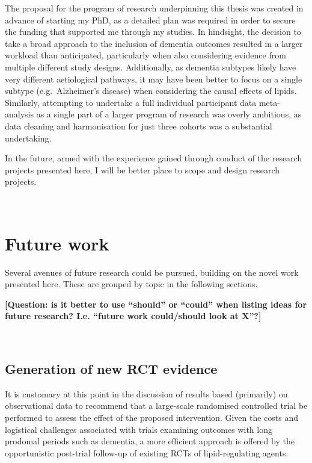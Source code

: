 \documentclass[a4paper, twoside]{templates/ociamthesis}
\begin{document}
The proposal for the program of research underpinning this thesis was created in advance of starting my PhD, as a detailed plan was required in order to secure the funding that supported me through my studies. In hindsight, the decision to take a broad approach to the inclusion of dementia outcomes resulted in a larger workload than anticipated, particularly when also considering evidence from multiple different study designs. Additionally, as dementia subtypes likely have very different aetiological pathways, it may have been better to focus on a single subtype (e.g.~Alzheimer's disease) when considering the causal effects of lipids. Similarly, attempting to undertake a full individual participant data meta-analysis as a single part of a larger program of research was overly ambitious, as data cleaning and harmonisation for just three cohorts was a substantial undertaking.

In the future, armed with the experience gained through conduct of the research projects presented here, I will be better place to scope and design research projects.

~

\hypertarget{future-work-1}{%
\section{Future work}\label{future-work-1}}

Several avenues of future research could be pursued, building on the novel work presented here. These are grouped by topic in the following sections.

\textbf{{[}Question: is it better to use ``should'' or ``could'' when listing ideas for future research? I.e. ``future work could/should look at X''?{]}}

~

\hypertarget{generation-of-new-rct-evidence}{%
\subsection{Generation of new RCT evidence}\label{generation-of-new-rct-evidence}}

It is customary at this point in the discussion of results based (primarily) on observational data to recommend that a large-scale randomised controlled trial be performed to assess the effect of the proposed intervention. Given the costs and logistical challenges associated with trials examining outcomes with long prodomal periods such as dementia, a more efficient approach is offered by the opportunistic post-trial follow-up of existing RCTs of lipid-regulating agents.
\end{document}
